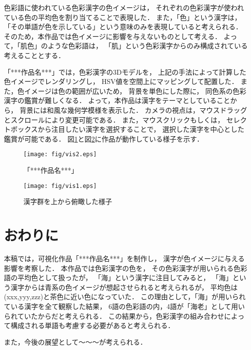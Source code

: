 \documentclass[a4j,twocolumn]{ujarticle} %
\newcommand{\workname}{「***作品名***」}
\newcommand{\colorname}{色彩語}
\newcommand{\colorkanji}{色彩漢字}
\newcommand{\recallcolor}{色イメージ}
\begin{document}
\colorname{}に使われている\colorkanji{}の\recallcolor{}は，
それぞれの\colorkanji{}が使われている色の平均色を割り当てることで表現した．
また，「色」という漢字は，
「その単語が色を示している」という意味のみを表現していると考えられる．
そのため，本作品では\recallcolor{}に影響を与えないものとして考える．
よって，「肌色」のような\colorname{}は，
「肌」という\colorkanji{}からのみ構成されている考えることとする．

\workname{}では，\colorkanji{}の3Dモデルを，
上記の手法によって計算した\recallcolor{}でレンダリングし，
HSV値を空間上にマッピングして配置した．
また，\recallcolor{}は色の範囲が広いため，
背景を単色にした際に，
同色系の\colorkanji{}の鑑賞が難しくなる．
よって，本作品は漢字をテーマとしていることから，
背景には和風な幾何学模様を表示した．
カメラの視点は，マウスドラッグとスクロールにより変更可能である．
また，マウスクリックもしくは，
セレクトボックスから注目したい漢字を選択することで，
選択した漢字を中心とした鑑賞が可能である．
図\ref{works1}と図\ref{works2}に作品が動作している様子を示す．




\begin{figure}[htbp]
  \texttt{[image: fig/vis2.eps]}
  \caption{\workname{}}
  \label{works1}
\end{figure}

\begin{figure}[htbp]
  \texttt{[image: fig/vis1.eps]}
  \caption{漢字群を上から俯瞰した様子}
  \label{works2}
\end{figure}

\section{おわりに}

本稿では，可視化作品\workname{}を制作し，
漢字が\recallcolor{}に与える影響を考察した．
本作品では\colorkanji{}の色を，
その\colorkanji{}が用いられる\colorname{}の平均色として扱ったが，
「海」という漢字に注目してみると，
「海」という漢字からは青系の\recallcolor{}が想起させられると考えられるが，
平均色は(xxx,yyy,zzz)と茶色に近い色になっていた．
この理由として，「海」が用いられている漢字を全て観察した結果，
6語の\colorname{}の内，4語が「海老」として用いられていたからだと考えられる．
この結果から，\colorkanji{}の組み合わせによって構成される単語も考慮する必要があると考えられる．

また，今後の展望として〜〜〜が考えられる．




\end{document}
